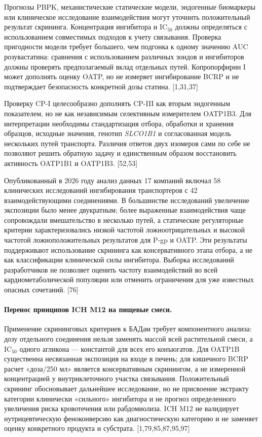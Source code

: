 \documentclass[11pt]{article}
\begin{document}
Прогнозы PBPK, механистические статические модели, эндогенные биомаркеры или клиническое исследование взаимодействия могут уточнить положительный результат скрининга. Концентрация ингибитора и \(\mathrm{IC}_{50}\) должны определяться с использованием совместимых подходов к учету связывания. Проверка пригодности модели требует большего, чем подгонка к одному значению AUC розувастатина: сравнения с использованием различных зондов и ингибиторов должны проверять предполагаемый вклад отдельных путей. Копропорфирин I может дополнять оценку OATP, но не измеряет ингибирование BCRP и не подтверждает безопасность конкретной дозы статина. [1,31,37]

Проверку CP-I целесообразно дополнять CP-III как вторым эндогенным показателем, но не как независимым селективным измерителем OATP1B3. Для интерпретации необходимы стандартизация отбора, обработки и хранения образцов, исходные значения, генотип \textit{SLCO1B1} и согласованная модель нескольких путей транспорта. Различия ответов двух изомеров сами по себе не позволяют решить обратную задачу и единственным образом восстановить активность OATP1B1 и OATP1B3. [52,53]

Опубликованный в 2026 году анализ данных 17 компаний включал 58 клинических исследований ингибирования транспортеров с 42 взаимодействующими соединениями. В большинстве исследований увеличение экспозиции было менее двукратным; более выраженные взаимодействия чаще сопровождали вмешательство в несколько путей, а статические регуляторные критерии характеризовались низкой частотой ложноотрицательных и высокой частотой ложноположительных результатов для P-gp и OATP. Эти результаты поддерживают использование скрининга как консервативного этапа отбора, а не как классификации клинической силы ингибитора. Выборка исследований разработчиков не позволяет оценить частоту взаимодействий во всей кардиометаболической популяции или отменить ограничения для уже известных опасных сочетаний. [76]

\paragraph{Перенос принципов ICH M12 на пищевые смеси.}
Применение скрининговых критериев к БАДам требует компонентного анализа: дозу отдельного соединения нельзя заменять массой всей растительной смеси, а \(\mathrm{IC}_{50}\) одного агликона --- константой для всех его конъюгатов. Для OATP1B существенна несвязанная экспозиция на входе в печень; для кишечного BCRP расчет «доза/250 мл» является консервативным скринингом, а не измеренной концентрацией у внутриклеточного участка связывания. Положительный скрининг обосновывает дальнейшее исследование, но не присвоение экстракту категории клинически «сильного» ингибитора и не прогноз определенного увеличения риска кровотечения или рабдомиолиза. ICH M12 не валидирует нутрицевтическую феноконверсию как диагностическую категорию и не заменяет оценку конкретного продукта и субстрата. [1,79,85,87,95,97]
\end{document}
